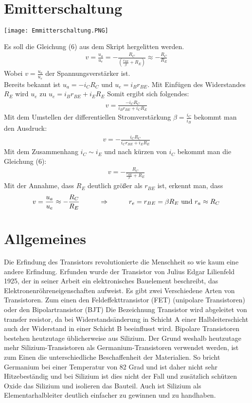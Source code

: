 \section{Emitterschaltung}
\begin{center}
    \texttt{[image: Emmitterschaltung.PNG]}
\end{center}
Es soll die Gleichung (6) aus dem Skript hergelitten werden.
\begin{align}
    v=\frac{u_a}{u_e}= -\frac{R_C}{(\frac{r_{BE}}{ \beta }+R_E)} \approx -\frac{R_C}{R_E}
\end{align}
Wobei $v=\frac{u_a}{u_e}$ der Spannungsverst\"arker ist.\\
Bereits bekannt ist 
$u_a= -i_CR_C$ und $u_e=i_Br_{BE}$. Mit Einf\"ugen des Widerstandes $R_E$ wird $u_e$ zu $u_e=i_Br_{BE}+i_ER_E$
Somit ergibt sich folgendes:
\begin{align}
    v=\frac{-i_CR_C}{i_Br_{BE}+i_CR_E}
\end{align}
Mit dem Umstellen der differentiellen Stromverst\"arkung  $\beta = \frac{i_C}{i_B}$ bekommt man den Ausdruck:
\begin{align}
    v=-\frac{i_CR_C}{i_Cr_{BE}+i_ER_E}
\end{align}
Mit dem Zusammenhang $i_C\sim i_E$ und nach k\"urzen von $i_C$ bekommt man die Gleichung (6):
\begin{align}
    v=-\frac{R_C}{\frac{r_{BE}}{\beta}+R_E}
\end{align}
Mit der Annahme, dass $R_E$ deutlich gr\"o\ss{}er als $r_{BE}$ ist, erkennt man, dass
\begin{align}
    v=\frac{u_a}{u_e} \approx -\frac{R_C}{R_E} \hspace*{1cm} \Rightarrow \hspace*{1cm} r_e=r_{BE}= \beta R_E~\text{und}~r_a\approx R_C
\end{align}

\section{Allgemeines}
Die Erfindung des Transistors revolutionierte die Menschheit so wie kaum eine andere
Erfindung.
Erfunden wurde der Transistor von Julius Edgar Lilienfeld 1925, der in seiner Arbeit ein
elektronisches Bauelement beschreibt, das Elektronenröhreneigenschaften aufweist.
Es gibt zwei Verschiedene Arten von Transistoren. Zum einen den Feldeffekttransistor (FET)
(unipolare Transistoren) oder den Bipolartransistor (BJT)
Die Bezeichnung Transistor wird abgeleitet von transfer resistor, da bei Widerstandsänderung in Schicht A
einer Halbleiterschicht auch der Widerstand in einer Schicht B beeinflusst wird.
Bipolare Transistoren bestehen heutzutage üblicherweise aus Silizium. Der Grund weshalb heutzutage mehr Silizium-Transistoren als Germanium-Transistoren verwendet werden, ist zum Einen die unterschiedliche Beschaffenheit der Materialien. So bricht Germanium bei einer Temperatur von 82 Grad und ist daher nicht sehr Hitzebest\"andig und bei Silizium ist dies nicht der Fall und zus\"atzlich sch\"utzen Oxide das Silizium und isolieren das Bauteil. Auch ist Silizium als Elementarhalbleiter deutlich einfacher zu gewinnen und zu handhaben. 